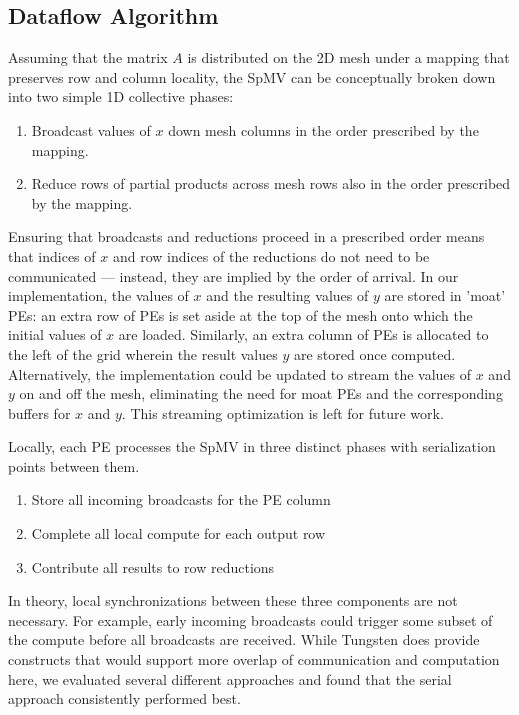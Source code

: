 \documentclass[conference]{IEEEtran}
\begin{document}
\subsection{Dataflow Algorithm}
Assuming that the matrix $A$ is distributed on the 2D mesh under a mapping that preserves row and column locality, the SpMV can be conceptually
broken down into two simple 1D collective phases:
\begin{enumerate}
    \item Broadcast values of $x$ down mesh columns in the order prescribed by the mapping.
    \item Reduce rows of partial products across mesh rows also in the order prescribed by the mapping.
\end{enumerate}

Ensuring that broadcasts and reductions proceed in a prescribed order means that indices of $x$ and row indices of the reductions do not need to be communicated --- instead, they are implied by the order of arrival.
In our implementation, the values of $x$ and the resulting values of $y$ are stored in 'moat' PEs: an extra row of PEs is set aside at the top of the
mesh onto which the initial values of $x$ are loaded. Similarly, an extra column of PEs is allocated to the left of the grid wherein the result values $y$ are stored
once computed. Alternatively, the implementation could be updated to stream the values of $x$ and $y$ on and off the mesh, eliminating the need for moat PEs and the corresponding buffers for $x$ and $y$. This streaming optimization is left for future work.

Locally, each PE processes the SpMV in three distinct phases with serialization points between them.
\begin{enumerate}
    \item Store all incoming broadcasts for the PE column
    \item Complete all local compute for each output row
    \item Contribute all results to row reductions
\end{enumerate}
In theory, local synchronizations between these three components are not necessary. For example, early incoming broadcasts could trigger some subset of the compute before all broadcasts are received.
While Tungsten does provide constructs that would support more overlap
of communication and computation here, we evaluated several different approaches and found that the serial approach consistently performed best.
\end{document}
